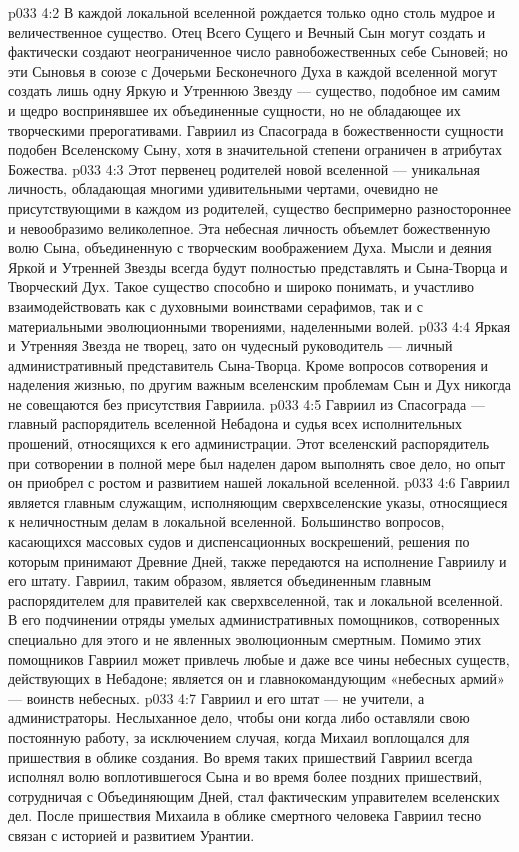 \vs p033 4:2 В каждой локальной вселенной рождается только одно столь мудрое и величественное существо. Отец Всего Сущего и Вечный Сын могут создать и фактически создают неограниченное число равнобожественных себе Сыновей; но эти Сыновья в союзе с Дочерьми Бесконечного Духа в каждой вселенной могут создать лишь одну Яркую и Утреннюю Звезду --- существо, подобное им самим и щедро воспринявшее их объединенные сущности, но не обладающее их творческими прерогативами. Гавриил из Спасограда в божественности сущности подобен Вселенскому Сыну, хотя в значительной степени ограничен в атрибутах Божества.
\vs p033 4:3 Этот первенец родителей новой вселенной --- уникальная личность, обладающая многими удивительными чертами, очевидно не присутствующими в каждом из родителей, существо беспримерно разностороннее и невообразимо великолепное. Эта небесная личность объемлет божественную волю Сына, объединенную с творческим воображением Духа. Мысли и деяния Яркой и Утренней Звезды всегда будут полностью представлять и Сына\hyp{}Творца и Творческий Дух. Такое существо способно и широко понимать, и участливо взаимодействовать как с духовными воинствами серафимов, так и с материальными эволюционными творениями, наделенными волей.
\vs p033 4:4 \pc Яркая и Утренняя Звезда не творец, зато он чудесный руководитель --- личный административный представитель Сына\hyp{}Творца. Кроме вопросов сотворения и наделения жизнью, по другим важным вселенским проблемам Сын и Дух никогда не совещаются без присутствия Гавриила.
\vs p033 4:5 Гавриил из Спасограда --- главный распорядитель вселенной Небадона и судья всех исполнительных прошений, относящихся к его администрации. Этот вселенский распорядитель при сотворении в полной мере был наделен даром выполнять свое дело, но опыт он приобрел с ростом и развитием нашей локальной вселенной.
\vs p033 4:6 Гавриил является главным служащим, исполняющим сверхвселенские указы, относящиеся к неличностным делам в локальной вселенной. Большинство вопросов, касающихся массовых судов и диспенсационных воскрешений, решения по которым принимают Древние Дней, также передаются на исполнение Гавриилу и его штату. Гавриил, таким образом, является объединенным главным распорядителем для правителей как сверхвселенной, так и локальной вселенной. В его подчинении отряды умелых административных помощников, сотворенных специально для этого и не явленных эволюционным смертным. Помимо этих помощников Гавриил может привлечь любые и даже все чины небесных существ, действующих в Небадоне; является он и главнокомандующим «небесных армий» --- воинств небесных.
\vs p033 4:7 \pc Гавриил и его штат --- не учители, а администраторы. Неслыханное дело, чтобы они когда либо оставляли свою постоянную работу, за исключением случая, когда Михаил воплощался для пришествия в облике создания. Во время таких пришествий Гавриил всегда исполнял волю воплотившегося Сына и во время более поздних пришествий, сотрудничая с Объединяющим Дней, стал фактическим управителем вселенских дел. После пришествия Михаила в облике смертного человека Гавриил тесно связан с историей и развитием Урантии.
